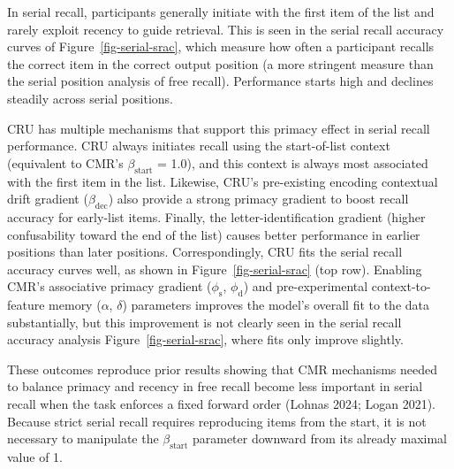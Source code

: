 \documentclass[
  letterpaper,
  DIV=11,
  numbers=noendperiod]{scrartcl}
\begin{document}
In serial recall, participants generally initiate with the first item of
the list and rarely exploit recency to guide retrieval. This is seen in
the serial recall accuracy curves of Figure~\ref{fig-serial-srac}, which
measure how often a participant recalls the correct item in the correct
output position (a more stringent measure than the serial position
analysis of free recall). Performance starts high and declines steadily
across serial positions.

CRU has multiple mechanisms that support this primacy effect in serial
recall performance. CRU always initiates recall using the start-of-list
context (equivalent to CMR's \(\beta_\text{start}\) = 1.0), and this
context is always most associated with the first item in the list.
Likewise, CRU's pre-existing encoding contextual drift gradient
(\(\beta_\text{dec}\)) also provide a strong primacy gradient to boost
recall accuracy for early-list items. Finally, the letter-identification
gradient (higher confusability toward the end of the list) causes better
performance in earlier positions than later positions. Correspondingly,
CRU fits the serial recall accuracy curves well, as shown in
Figure~\ref{fig-serial-srac} (top row). Enabling CMR's associative
primacy gradient (\(\phi_\text{s}\), \(\phi_\text{d}\)) and
pre-experimental context-to-feature memory (\(\alpha\), \(\delta\))
parameters improves the model's overall fit to the data substantially,
but this improvement is not clearly seen in the serial recall accuracy
analysis Figure~\ref{fig-serial-srac}, where fits only improve slightly.

These outcomes reproduce prior results showing that CMR mechanisms
needed to balance primacy and recency in free recall become less
important in serial recall when the task enforces a fixed forward order
(Lohnas 2024; Logan 2021). Because strict serial recall requires
reproducing items from the start, it is not necessary to manipulate the
\(\beta_\text{start}\) parameter downward from its already maximal value
of 1.
\end{document}
